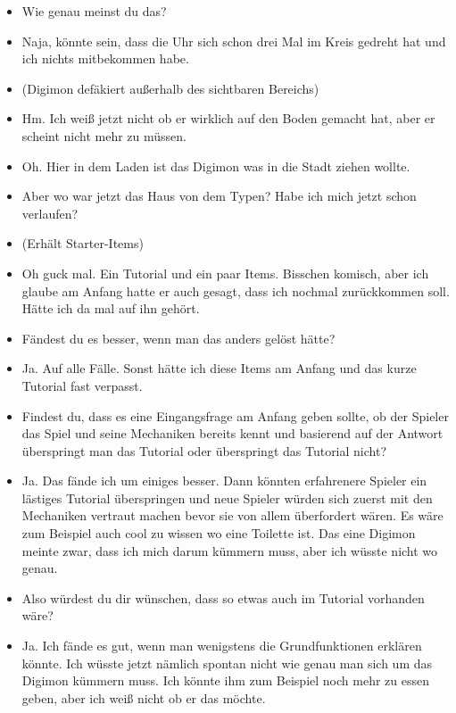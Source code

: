 {\begin{itemize}[]
    \item {} Wie genau meinst du das?
    \item {} Naja, könnte sein, dass die Uhr sich schon drei Mal im Kreis gedreht hat und ich nichts mitbekommen habe. 
    \item {} (Digimon defäkiert außerhalb des sichtbaren Bereichs)
    \item {} Hm. Ich weiß jetzt nicht ob er wirklich auf den Boden gemacht hat, aber er scheint nicht mehr zu müssen.
    \item {} Oh. Hier in dem Laden ist das Digimon was in die Stadt ziehen wollte.
    \item {} Aber wo war jetzt das Haus von dem Typen? Habe ich mich jetzt schon verlaufen?
    \item {} (Erhält Starter-Items)
    \item {} Oh guck mal. Ein Tutorial und ein paar Items. Bisschen komisch, aber ich glaube am Anfang hatte er auch gesagt, dass ich nochmal zurückkommen soll. Hätte ich da mal auf ihn gehört. 
    \item {} Fändest du es besser, wenn man das anders gelöst hätte?
    \item {} Ja. Auf alle Fälle. Sonst hätte ich diese Items am Anfang und das kurze Tutorial fast verpasst.
    \item {} Findest du, dass es eine Eingangsfrage am Anfang geben sollte, ob der Spieler das Spiel und seine Mechaniken bereits kennt und basierend auf der Antwort überspringt man das Tutorial oder überspringt das Tutorial nicht?
    \item {} Ja. Das fände ich um einiges besser. Dann könnten erfahrenere Spieler ein lästiges Tutorial überspringen und neue Spieler würden sich zuerst mit den Mechaniken vertraut machen bevor sie von allem überfordert wären. Es wäre zum Beispiel auch cool zu wissen wo eine Toilette ist. Das eine Digimon meinte zwar, dass ich mich darum kümmern muss, aber ich wüsste nicht wo genau.
    \item {} Also würdest du dir wünschen, dass so etwas auch im Tutorial vorhanden wäre?
    \item {} Ja. Ich fände es gut, wenn man wenigstens die Grundfunktionen erklären könnte. Ich wüsste jetzt nämlich spontan nicht wie genau man sich um das Digimon kümmern muss. Ich könnte ihm zum Beispiel noch mehr zu essen geben, aber ich weiß nicht ob er das möchte.

\end{itemize}}
